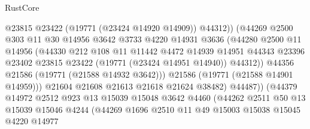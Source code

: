 \begin{lexlean}{RustCore}
\begin{coremodule}
                                @23815
                                @23422
                                (@19771 (@23424 @14920 @14909))
                                @44312))
                            (@44269
                              @2500
                              @303
                              @11
                              @30
                              @14956
                              @3642
                              @3733
                              @4220
                              @14931
                              @3636
                              (@44280
                                @2500
                                @11
                                @14956
                                (@44330
                                  @212
                                  @108
                                  @11
                                  @11442
                                  @4472
                                  @14939
                                  @14951
                                  @44343
                                  @23396
                                  @23402
                                  @23815
                                  @23422
                                  (@19771 (@23424 @14951 @14940))
                                  @44312))
                              @44356
                              @21586
                              (@19771 (@21588 @14932 @3642)))
                            @21586
                            (@19771 (@21588 @14901 @14959)))
                          @21604
                          @21608
                          @21613
                          @21618
                          @21624
                          @38482)
                        @44487))
                    (@44379
                      @14972
                      @2512
                      @923
                      @13
                      @15039
                      @15048
                      @3642
                      @4460
                      (@44262
                        @2511
                        @50
                        @13
                        @15039
                        @15046
                        @4244
                        (@44269
                          @1696
                          @2510
                          @11
                          @49
                          @15003
                          @15038
                          @15045
                          @4220
                          @14977

\end{coremodule}
\end{lexlean}
